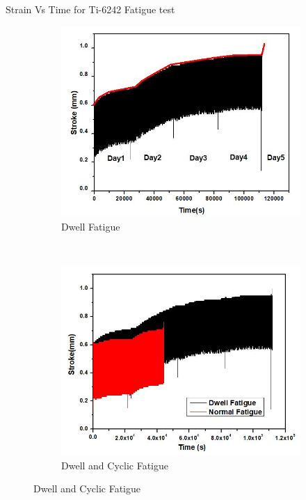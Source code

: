 \documentclass[10pt]{beamer}
\begin{document}
\begin{frame}{Strain Vs Time for Ti-6242 Fatigue test}

\begin{figure}[H]
    \centering
    \begin{subfigure}{0.38\textwidth}
        \includegraphics[width=\textwidth]{images/Dwell.JPG}
        \caption{Dwell Fatigue}
    \end{subfigure}
    \\
    \begin{subfigure}{0.38\textwidth}
        \includegraphics[width=\textwidth]{images/Dwell and cyclic.JPG}
        \caption{Dwell and Cyclic Fatigue}
    \end{subfigure}    
\end{figure}

\end{frame}
\end{document}
